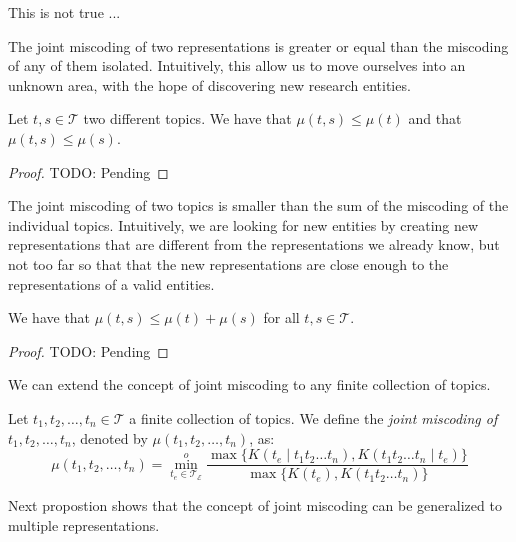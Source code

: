 This is not true ...

The joint miscoding of two representations is greater or equal than the miscoding of any of them isolated. Intuitively, this allow us to move ourselves into an unknown area, with the hope of discovering new research entities.

\begin{proposition}
Let $t, s \in \mathcal{T}$ two different topics. We have that $\mu(t,s) \leq \mu(t)$ and that $\mu(t,s) \leq \mu(s)$.
\end{proposition}
\begin{proof}
{\color{red} TODO: Pending}
\end{proof}

The joint miscoding of two topics is smaller than the sum of the miscoding of the individual topics. Intuitively, we are looking for new entities by creating new representations that are different from the representations we already know, but not too far so that that the new representations are close enough to the representations of a valid entities.

\begin{proposition}
We have that $\mu(t,s) \leq \mu(t) + \mu(s)$ for all $t, s \in \mathcal{T}$.
\end{proposition}
\begin{proof}
{\color{red} TODO: Pending}
\end{proof}

We can extend the concept of joint miscoding to any finite collection of topics.

\begin{definition}
Let $t_1, t_2, \ldots, t_n \in \mathcal{T}$ a finite collection of topics. We define the \emph{joint miscoding of} $t_1, t_2, \ldots, t_n$, denoted by $\mu(t_1, t_2, \ldots, t_n)$, as:
\[
\mu(t_1, t_2, \ldots, t_n) = \overset{o}{ \underset{t_e \in \mathcal{T}_\mathcal{E}} \min} \frac{ \max\{ K(t_e \mid t_1 t_2 \ldots t_n), K(t_1 t_2 \ldots t_n \mid t_e) \} } { \max\{ K(t_e), K(t_1 t_2 \ldots t_n) \} }
\]
\end{definition}

Next propostion shows that the concept of joint miscoding can be generalized to multiple representations.

